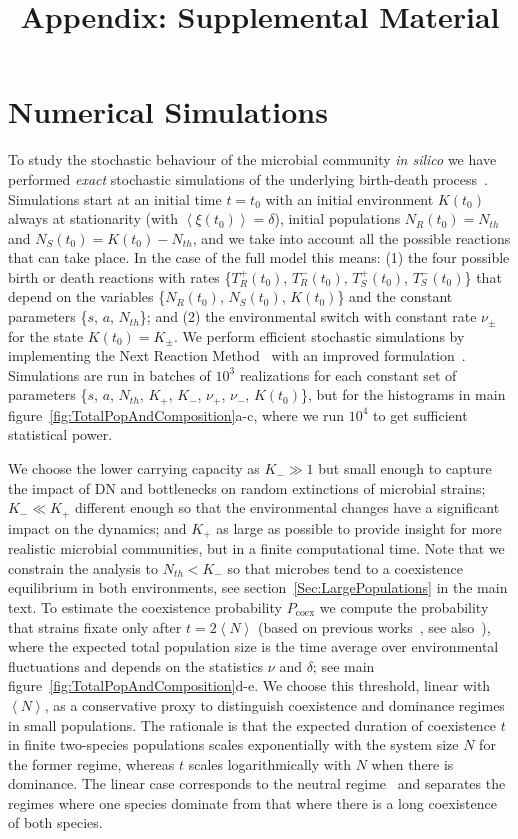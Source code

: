 \documentclass{article}
\begin{document}
\appendix
\title{{\huge\textbf{Appendix: Supplemental Material}}}

\section{Numerical Simulations}\label{SuppSec:Num_Sim}
To study the stochastic behaviour of the microbial community {\it in silico} we have performed {\it exact} stochastic simulations of the underlying birth-death process~\cite{Gillespie76}. Simulations start at an initial time \(t=t_0\) with an initial environment \(K(t_0)\) always at stationarity (with \(\left<\xi(t_0)\right>=\delta\)), initial populations \(N_R(t_0)=N_{th}\) and \(N_S(t_0)=K(t_0)-N_{th}\), and we take into account all the possible reactions that can take place. In the case of the full model this means: (1) the four possible birth or death reactions with rates \{\(T^+_{R}(t_0)\), \(T^-_{R}(t_0)\), \(T^+_{S}(t_0)\), \(T^-_{S}(t_0)\)\} that depend on the variables \{\(N_R(t_0)\), \(N_S(t_0)\), \(K(t_0)\)\} and the constant parameters \{\(s\), \(a\), \(N_{th}\)\}; and (2) the environmental switch with constant rate \(\nu_{\pm}\) for the state \(K(t_0)=K_{\pm}\). We perform efficient stochastic simulations by implementing the Next Reaction Method~\cite{gibson2000efficient} with an improved formulation~\cite{anderson2007modified}. Simulations are run in batches of \(10^3\) realizations for each constant set of parameters \{\(s\), \(a\), \(N_{th}\), \(K_{+}\), \(K_{-}\), \(\nu_{+}\), \(\nu_{-}\), \(K(t_0)\)\}, but for the histograms in main figure~\ref{fig:TotalPopAndComposition}a-c, where we run \(10^{4}\) to get sufficient statistical power.

We choose the lower carrying capacity as \(K_{-}\gg1\) but small enough to capture the impact of DN and bottlenecks on random extinctions of microbial strains; \(K_{-}\ll K_{+}\) different enough so that the environmental changes have a significant impact on the dynamics; and \(K_{+}\) as large as possible to provide insight for more realistic microbial communities, but in a finite computational time. Note that we constrain the analysis to \(N_{th}<K_{-}\) so that microbes tend to a coexistence equilibrium in both environments, see section~\ref{Sec:LargePopulations} in the main text. To estimate the coexistence probability \(P_{\text{coex}}\) we compute the probability that strains fixate only after \(t=2\left<N\right>\) (based on previous works~\cite{cremer2009edge}, see also~\cite{reich2007,he2011}), where the expected total population size is the time average over environmental fluctuations and depends on the statistics \(\nu\) and \(\delta\); see main figure~\ref{fig:TotalPopAndComposition}d-e. We choose this threshold, linear with \(\left<N\right>\), as a conservative proxy to distinguish coexistence and dominance regimes in small populations. The rationale is that the expected duration of coexistence \(t\) in finite two-species populations scales exponentially with the system size \(N\) for the former regime, whereas \(t\) scales logarithmically with \(N\) when there is dominance. The linear case corresponds to the neutral regime~\cite{antal2006fixation,cremer2009edge} and separates the regimes where one species dominate from that where there is a long coexistence of both species.
\end{document}
